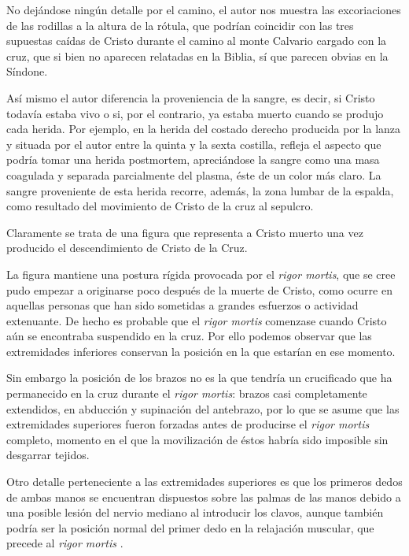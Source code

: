 No dejándose ningún detalle por el camino, el autor nos muestra las excoriaciones de las rodillas a la altura de la rótula, que podrían coincidir con las tres supuestas caídas de Cristo durante el camino al monte Calvario cargado con la cruz, que si bien no aparecen relatadas en la Biblia, sí que parecen obvias en la Síndone.

Así mismo el autor diferencia la proveniencia de la sangre, es decir, si Cristo todavía estaba vivo o si, por el contrario, ya estaba muerto cuando se produjo cada herida. Por ejemplo, en la herida del costado derecho producida por la lanza y situada por el autor entre la quinta y la sexta costilla, refleja el aspecto que podría tomar una herida postmortem, apreciándose la sangre como una masa coagulada y separada parcialmente del plasma, éste de un color más claro. La sangre proveniente de esta herida recorre, además, la zona lumbar de la espalda, como resultado del movimiento de Cristo de la cruz al sepulcro.

Claramente se trata de una figura que representa a Cristo muerto una vez producido el descendimiento de Cristo de la Cruz.

La figura mantiene una postura rígida provocada por el \textit{rigor mortis}, que se cree pudo empezar a originarse poco después de la muerte de Cristo, como ocurre en aquellas personas que han sido sometidas a grandes esfuerzos o actividad extenuante.\cite{RefWorks:60} De hecho es probable que el \textit{rigor mortis} comenzase cuando Cristo aún se encontraba suspendido en la cruz. Por ello podemos observar que las extremidades inferiores conservan la posición en la que estarían en ese momento.

Sin embargo la posición de los brazos no es la que tendría un crucificado que ha permanecido en la cruz durante el \textit{rigor mortis}: brazos casi completamente extendidos, en abducción y supinación del antebrazo, por lo que se asume que las extremidades superiores fueron forzadas antes de producirse el \textit{rigor mortis} completo, momento en el que la movilización de éstos habría sido imposible sin desgarrar tejidos. 

Otro detalle perteneciente a las extremidades superiores es que los primeros dedos de ambas manos se encuentran dispuestos sobre las palmas de las manos debido a una posible lesión del nervio mediano al introducir los clavos, aunque también podría ser la posición normal del primer dedo en la relajación muscular, que precede al \textit{rigor mortis}%
.

